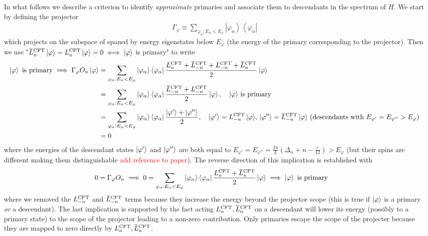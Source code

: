 \documentclass[10pt, a4paper]{article}
\begin{document}
{\begin{enumerate}
  In what follows we describe a criterion to identify \textit{approximate} primaries and associate them to descendants in the spectrum of $H$. We start by defining the projector
  \begin{align*}
    \Gamma_{\varphi} \equiv \sum_{\varphi_\alpha: E_\alpha<E_{\varphi}}\left|\varphi_\alpha\right\rangle\left\langle\varphi_\alpha\right|
  \end{align*}
  which projects on the subspace of spaned by energy eigenstates below $E_\varphi$ (the energy of the primary corresponding to the projector). Then we use "$\bar{L}_{n}^{\rm CFT} \ket{\varphi} = L_{n}^{\rm CFT} \ket{\varphi} = 0 \iff \ket{\varphi}$ is primary" to write 
  \begin{align*}
    \ket{\varphi} \text{ is primary} \implies \Gamma_{\varphi} O_n \ket{\varphi} &= \sum_{\varphi_\alpha: E_\alpha<E_{\varphi}}\left|\varphi_\alpha\right\rangle\left\langle\varphi_\alpha\right|\frac{L_n^{\rm C F T}+\bar{L}_{-n}^{\rm C F T}+L_{-n}^{\rm C F T}+\bar{L}_n^{\rm C F T}}{2} \ket{\varphi} \\
    &=  \sum_{\varphi_\alpha: E_\alpha<E_{\varphi}}\left|\varphi_\alpha\right\rangle\left\langle\varphi_\alpha\right|\frac{\bar{L}_{-n}^{\rm C F T}+L_{-n}^{\rm C F T}}{2} \ket{\varphi}, \quad \text{$\ket{\varphi}$ is primary}\\
    &= \sum_{\varphi_\alpha: E_\alpha<E_{\varphi}}\left|\varphi_\alpha\right\rangle\left\langle\varphi_\alpha\right| \frac{\ket{\varphi'} + \ket{\varphi''}}{2}, \quad \text{$\ket{\varphi'} = L_{-n}^{\rm C F T} \ket{\varphi}$, $\ket{\varphi''} = \bar{L}_{-n}^{\rm C F T} \ket{\varphi}$ (descendants with $E_{\varphi'} = E_{\varphi''} > E_{\varphi}$)}\\
    &= 0 
  \end{align*}
  where the energies of the descendant states $\ket{\varphi'}$ and $\ket{\varphi''}$ are both equal to $E_{\varphi'} = E_{\varphi''} = \frac{2\pi}{L} (\Delta_\alpha + n - \frac{c}{12}) > E_\varphi$ (but their spins are different making them distinguishable \textcolor{red}{add reference to paper}). 
  \newpage 
  The reverse direction of this implication is established with 
  \begin{align*}
    0 &= \Gamma_{\varphi} O_n \implies 0 = \sum_{\varphi_\alpha: E_\alpha<E_{\varphi}}\left|\varphi_\alpha\right\rangle\left\langle\varphi_\alpha\right|\frac{L_n^{\rm C F T} + \bar{L}_n^{\rm C F T}}{2} \ket{\varphi} \implies \ket{\varphi} \text{ is primary}
  \end{align*}
  where we removed the $L_{-n}^{\rm C F T}$ and $\bar{L}_{-n}^{\rm C F T}$ terms because they increase the energy beyond the projector scope (this is true if $\ket{\varphi}$ is a primary \textit{or} a descendant). The last implication is supported by the fact acting $L_n^{\rm C F T}, \bar{L}_n^{\rm C F T}$ on a descendant will lower its energy (possibly to a primary state) to the scope of the projector leading to a non-zero contribution. Only primaries escape the scope of the projecter because they are mapped to zero directly by $L_n^{\rm C F T}, \bar{L}_n^{\rm C F T}$.\\
  

\end{enumerate}}
\end{document}

